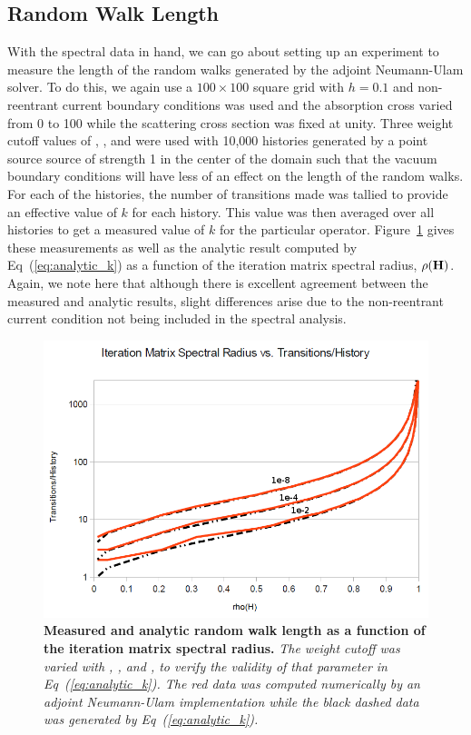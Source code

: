 \documentclass[letterpaper,12pt]{article}
\begin{document}
\subsection{Random Walk Length}
With the spectral data in hand, we can go about setting up an
experiment to measure the length of the random walks generated by the
adjoint Neumann-Ulam solver. To do this, we again use a $100 \times
100$ square grid with $h=0.1$ and non-reentrant current boundary
conditions was used and the absorption cross varied from 0 to 100
while the scattering cross section was fixed at unity. Three weight
cutoff values of , , and  were used with
10,000 histories generated by a point source source of strength 1 in
the center of the domain such that the vacuum boundary conditions will
have less of an effect on the length of the random walks. For each of
the histories, the number of transitions made was tallied to provide
an effective value of $k$ for each history. This value was then
averaged over all histories to get a measured value of $k$ for the
particular operator. Figure~\ref{fig:measured_length} gives these
measurements as well as the analytic result computed by
Eq~(\ref{eq:analytic_k}) as a function of the iteration matrix
spectral radius, $\rho(\mathbf{H})$. Again, we note here that although
there is excellent agreement between the measured and analytic
results, slight differences arise due to the non-reentrant current
condition not being included in the spectral analysis.
\begin{figure}[t!]
  \begin{center}
    \includegraphics[width=5in,clip]{measured_length.png}
  \end{center}
  \caption{\textbf{Measured and analytic random walk length as a
      function of the iteration matrix spectral radius.} \textit{The
      weight cutoff was varied with , , and
      , to verify the validity of that parameter in
      Eq~(\ref{eq:analytic_k}). The red data was computed numerically
      by an adjoint Neumann-Ulam implementation while the black dashed
      data was generated by Eq~(\ref{eq:analytic_k}).}}
  \label{fig:measured_length}
\end{figure}
\end{document}
